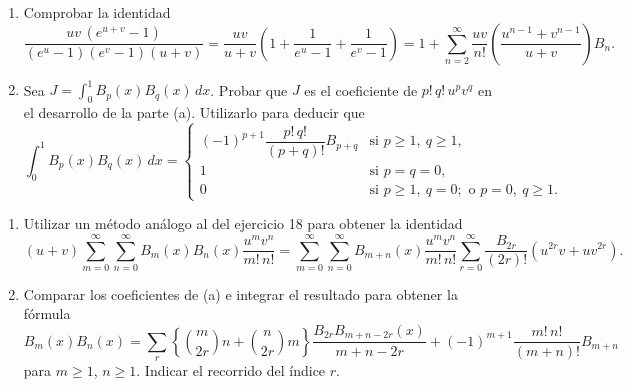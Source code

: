 \documentclass[12pt,a4paper]{book}
\begin{document}
    \begin{ejercicio}
        \begin{enumerate}
            \item[(a)] Comprobar la identidad
            \begin{equation*}
                \frac{uv\,(e^{u+v}-1)}{(e^{u}-1)(e^{v}-1)(u+v)}=\frac{uv}{u+v}\left(1+\frac{1}{e^{u}-1}+\frac{1}{e^{v}-1}\right)=1+\sum_{n=2}^{\infty}\frac{uv}{n!}\left(\frac{u^{n-1}+v^{n-1}}{u+v}\right)B_{n}.
            \end{equation*}
            \item[(b)] Sea $J=\int_{0}^{1}B_{p}(x)B_{q}(x)\,dx$. Probar que $J$ es el coeficiente de
            $p!\,q!\,u^{p}v^{q}$ en el desarrollo de la parte (a). Utilizarlo para deducir que
            \begin{equation*}
                \int_{0}^{1}B_{p}(x)B_{q}(x)\,dx=
                \begin{cases}
                    (-1)^{p+1}\dfrac{p!\,q!}{(p+q)!}B_{p+q}&\text{si }p\geq1,\ q\geq1,\\[1.5ex]
                    1&\text{si }p=q=0,\\
                    0&\text{si }p\geq1,\ q=0;\text{ o }p=0,\ q\geq1.
                \end{cases}
            \end{equation*}
        \end{enumerate}
    \end{ejercicio}

    \begin{ejercicio}
        \begin{enumerate}
            \item[(a)] Utilizar un método análogo al del ejercicio 18 para obtener la
            identidad
            \begin{equation*}
                (u+v)\sum_{m=0}^{\infty}\sum_{n=0}^{\infty}B_{m}(x)B_{n}(x)\frac{u^{m}v^{n}}{m!\,n!}=\sum_{m=0}^{\infty}\sum_{n=0}^{\infty}B_{m+n}(x)\frac{u^{m}v^{n}}{m!\,n!}\sum_{r=0}^{\infty}\frac{B_{2r}}{(2r)!}\left(u^{2r}v+uv^{2r}\right).
            \end{equation*}
            \item[(b)] Comparar los coeficientes de (a) e integrar el resultado para obtener
            la fórmula
            \begin{equation*}
                B_{m}(x)B_{n}(x)=\sum_{r}\left\{\binom{m}{2r}n+\binom{n}{2r}m\right\}\frac{B_{2r}B_{m+n-2r}(x)}{m+n-2r}+(-1)^{m+1}\frac{m!\,n!}{(m+n)!}B_{m+n}
            \end{equation*}
            para $m\geq1$, $n\geq1$. Indicar el recorrido del índice $r$.
        \end{enumerate}
    \end{ejercicio}
\end{document}
